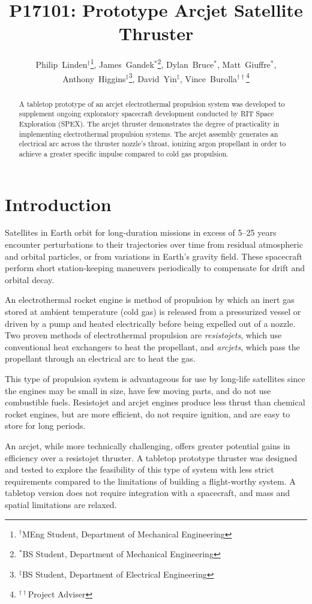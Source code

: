 \documentclass[journal]{IEEEtran}
\title{P17101: Prototype Arcjet Satellite Thruster}
\author{
  Philip~Linden$^{\dagger}$\thanks{$^{\dagger}$MEng Student, Department of Mechanical Engineering},
  James~Gandek$^{*}$\thanks{$^{*}$BS Student, Department of Mechanical Engineering},
  Dylan~Bruce$^{*}$,
  Matt~Giuffre$^{*}$,
  Anthony~Higgins$^{\ddagger}$\thanks{$^{\ddagger}$BS Student, Department of Electrical Engineering},
  David~Yin$^{\ddagger}$,
  Vince~Burolla$^{\dagger\dagger}$\thanks{$^{\dagger\dagger}$Project Adviser}
}
\begin{document}
\maketitle


\begin{abstract}
A tabletop prototype of an arcjet electrothermal propulsion system was developed to supplement ongoing exploratory spacecraft development conducted by RIT Space Exploration (SPEX). The arcjet thruster demonstrates the degree of practicality in implementing electrothermal propulsion systems. The arcjet assembly generates an electrical arc across the thruster nozzle's throat, ionizing argon propellant in order to achieve a greater specific impulse compared to cold gas propulsion.
\end{abstract}
\section{Introduction}
\label{sec:intro}
Satellites in Earth orbit for long-duration missions in excess of 5--25 years encounter perturbations to their trajectories over time from residual atmospheric and orbital particles, or from variations in Earth's gravity field.
These spacecraft perform short station-keeping maneuvers periodically to compensate for drift and orbital decay.

An electrothermal rocket engine is method of propulsion by which an inert gas stored at ambient temperature (cold gas) is released from a pressurized vessel or driven by a pump and heated electrically before being expelled out of a nozzle.
Two proven methods of electrothermal propulsion are \emph{resistojets}, which use conventional heat exchangers to heat the propellant, and \emph{arcjets}, which pass the propellant through an electrical arc to heat the gas.

This type of propulsion system is advantageous for use by long-life satellites since the engines may be small in size, have few moving parts, and do not use combustible fuels.
Resistojet and arcjet engines produce less thrust than chemical rocket engines, but are more efficient, do not require ignition, and are easy to store for long periods.

An arcjet, while more technically challenging, offers greater potential gains in efficiency over a resistojet thruster.
A tabletop prototype thruster was designed and tested to explore the feasibility of this type of system with less strict requirements compared to the limitations of building a flight-worthy system.
A tabletop version does not require integration with a spacecraft, and mass and spatial limitations are relaxed.
\end{document}
